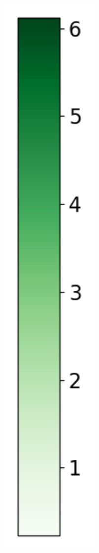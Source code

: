 \begin{figure}
\begin{subfigure}[b]{0.075\textwidth}
        \includegraphics[width=1\textwidth]{Results/kd-laplace/kd-Laplace/line-dataset/heatmap_legend_distance.png}
    \end{subfigure}
\end{figure}
